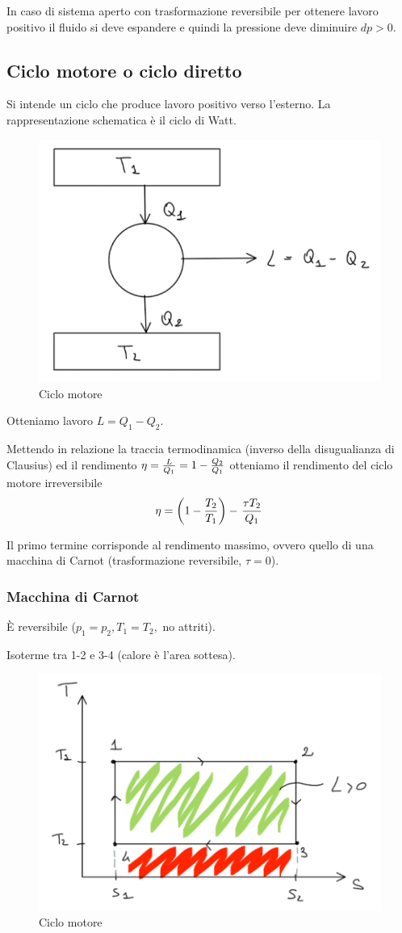 \documentclass[a4paper]{article}
\numberwithin{equation}{section}%
\begin{document}
In caso di sistema aperto con trasformazione reversibile per ottenere lavoro positivo il fluido si deve espandere e quindi la pressione deve diminuire $dp>0$. 

\subsection{Ciclo motore o ciclo diretto}

Si intende un ciclo che produce lavoro positivo verso l'esterno. La rappresentazione schematica è il ciclo di Watt. 

\begin{figure}[H]
	\begin{center}

		\includegraphics[width=0.3\columnwidth]{ciclomotore.png}
				\caption{Ciclo motore}
	\end{center}
\end{figure}

Otteniamo lavoro $L=Q_1-Q_2$.

Mettendo in relazione la traccia termodinamica (inverso della disugualianza di Clausius) ed il rendimento $\eta={L\over Q_1}={1-{Q_2\over Q_1}}$ otteniamo il rendimento del ciclo motore irreversibile 
\begin{equation}
	\eta=\left(1-{T_2\over T_1}\right)-\left. \tau T_2\over Q_1\right.
\end{equation}

Il primo termine corrisponde al rendimento massimo, ovvero quello di una macchina di Carnot (trasformazione reversibile, $\tau =0$).

\subsubsection{Macchina di Carnot}

È reversibile ($p_1=p_2,T_1=T_2,$ no attriti).

Isoterme tra 1-2 e 3-4 (calore è l'area sottesa).

\begin{figure}[H]
	\begin{center}
		
		\includegraphics[width=0.4\columnwidth]{carnot.png}
		\caption{Ciclo motore}
	\end{center}
\end{figure}
\end{document}
